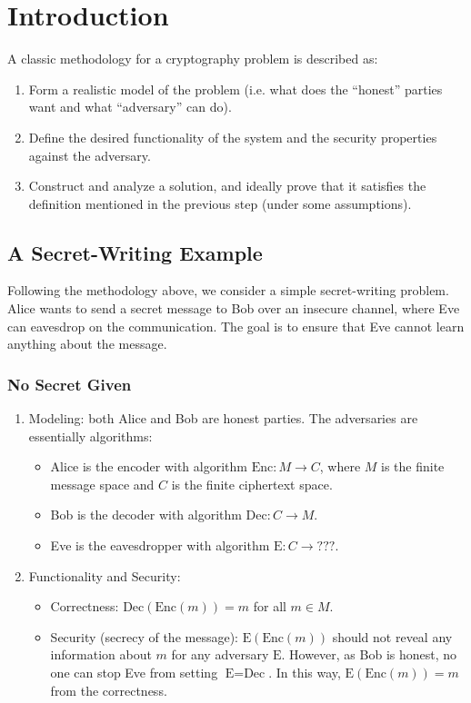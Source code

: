 \chapter{Introduction}

A classic methodology for a cryptography problem is described as:

\begin{enumerate}
	\item Form a realistic model of the problem (i.e. what does the ``honest'' parties want and what ``adversary'' can do).
	\item Define the desired functionality of the system and the security properties against the adversary.
	\item Construct and analyze a solution, and ideally prove that it satisfies the definition mentioned in the previous step (under some assumptions).
\end{enumerate}

\section{A Secret-Writing Example}

Following the methodology above, we consider a simple secret-writing problem. Alice wants to send a secret message to Bob over an insecure channel, where Eve can eavesdrop on the communication. The goal is to ensure that Eve cannot learn anything about the message.

\subsection{No Secret Given}

\begin{enumerate}
	\item Modeling: both Alice and Bob are honest parties. The adversaries are essentially algorithms:
	      \begin{itemize}
		      \item Alice is the encoder with algorithm $\text{Enc}: M \to C$, where $M$ is the finite message space and $C$ is the finite ciphertext space.
		      \item Bob is the decoder with algorithm $\text{Dec}: C \to M$.
		      \item Eve is the eavesdropper with algorithm $\text{E}: C \to \text{???}$.
	      \end{itemize}
	\item Functionality and Security:
	      \begin{itemize}
		      \item Correctness: $\text{Dec}(\text{Enc}(m)) = m$ for all $m \in M$.
		      \item Security (secrecy of the message): $\text{E}(\text{Enc}(m))$ should not reveal any information about $m$ for any adversary $\text{E}$.
		            However, as Bob is honest, no one can stop Eve from setting $\text{E} = \text{Dec}$. In this way, $\text{E}(\text{Enc}(m)) = m$ from the correctness.
	      \end{itemize}
\end{enumerate}

